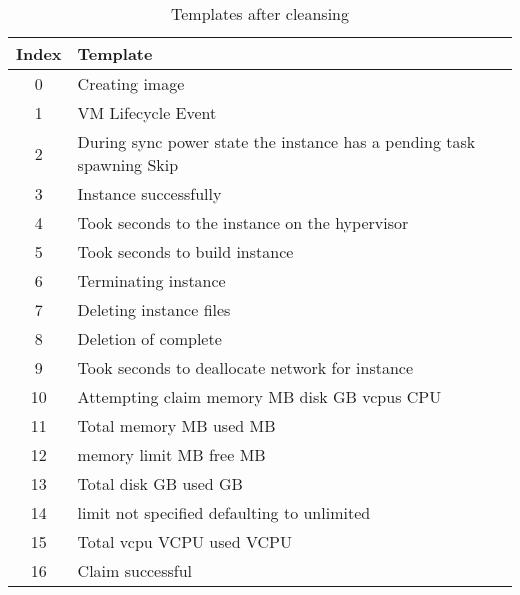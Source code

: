 \begin{table}[ht]
\begin{small}
\centering
\begin{tabular}{ c l } 
\toprule
Index & Template \\
\midrule
0 & Creating image\\
1 & VM  Lifecycle Event\\
2 & During sync power state the instance has a pending task spawning Skip\\
3 & Instance  successfully\\
4 & Took  seconds to  the instance on the hypervisor\\
5 & Took  seconds to build instance\\
6 & Terminating instance\\
7 & Deleting instance files\\
8 & Deletion of complete\\
9 & Took  seconds to deallocate network for instance\\
10 & Attempting claim memory  MB disk  GB vcpus  CPU\\
11 & Total memory  MB used  MB\\
12 & memory limit  MB free  MB\\
13 & Total disk  GB used  GB\\
14 & limit not specified defaulting to unlimited\\
15 & Total vcpu  VCPU used  VCPU\\
16 & Claim successful\\
\bottomrule
\end{tabular}
\caption{Templates after cleansing}
\label{tab:templates_after_cleansing}
\end{small}
\end{table}

